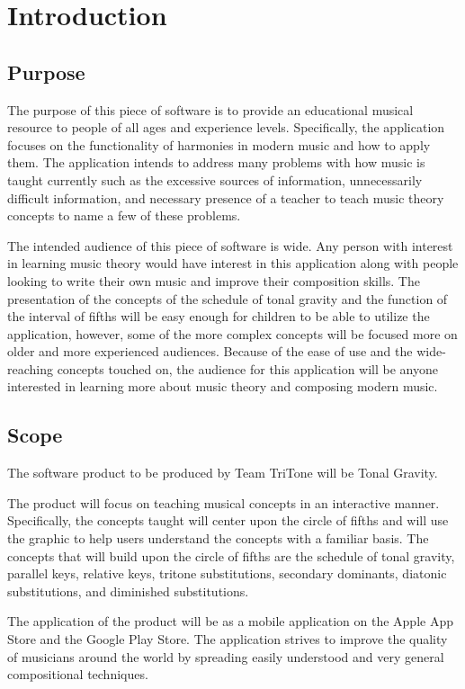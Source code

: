 \documentclass[onecolumn, draftclsnofoot,10pt, compsoc]{IEEEtran}
\begin{document}
\section{Introduction}
\subsection{Purpose}
\par
The purpose of this piece of software is to provide an educational musical resource to people of all ages and experience levels. 
Specifically, the application focuses on the functionality of harmonies in modern music and how to apply them.
The application intends to address many problems with how music is taught currently such as the excessive sources of information, unnecessarily difficult information, and necessary presence of a teacher to teach music theory concepts to name a few of these problems.

\par
The intended audience of this piece of software is wide.
Any person with interest in learning music theory would have interest in this application along with people looking to write their own music and improve their composition skills.
The presentation of the concepts of the schedule of tonal gravity and the function of the interval of fifths will be easy enough for children to be able to utilize the application, however, some of the more complex concepts will be focused more on older and more experienced audiences.
Because of the ease of use and the wide-reaching concepts touched on, the audience for this application will be anyone interested in learning more about music theory and composing modern music.

\subsection{Scope}
\par
The software product to be produced by Team TriTone will be Tonal Gravity.
\par
The product will focus on teaching musical concepts in an interactive manner.
Specifically, the concepts taught will center upon the circle of fifths and will use the graphic to help users understand the concepts with a familiar basis.
The concepts that will build upon the circle of fifths are the schedule of tonal gravity, parallel keys, relative keys, tritone substitutions, secondary dominants, diatonic substitutions, and diminished substitutions.
\par
The application of the product will be as a mobile application on the Apple App Store and the Google Play Store. 
The application strives to improve the quality of musicians around the world by spreading easily understood and very general compositional techniques.
\end{document}
